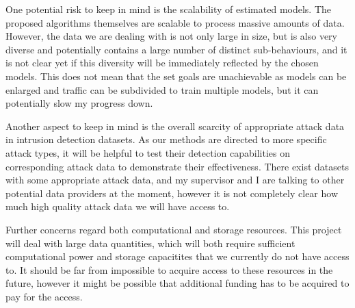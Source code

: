 \documentclass[a4paper,12pt,twoside]{report}
\begin{document}
One potential risk to keep in mind is the scalability of estimated models. The proposed algorithms themselves are scalable to process massive amounts of data. However, the data we are dealing with is not only large in size, but is also very diverse and potentially contains a large number of distinct sub-behaviours, and it is not clear yet if this diversity will be immediately reflected by the chosen models. This does not mean that the set goals are unachievable as models can be enlarged and traffic can be subdivided to train multiple models, but it can potentially slow my progress down.

Another aspect to keep in mind is the overall scarcity of appropriate attack data in intrusion detection datasets. As our methods are directed to more specific attack types, it will be helpful to test their detection capabilities on corresponding attack data to demonstrate their effectiveness. There exist datasets with some appropriate attack data, and my supervisor and I are talking to other potential data providers at the moment, however it is not completely clear how much high quality attack data we will have access to. 

Further concerns regard both computational and storage resources. This project will deal with large data quantities, which will both require sufficient computational power and storage capacitites that we currently do not have access to. It should be far from impossible to acquire access to these resources in the future, however it might be possible that additional funding has to be acquired to pay for the access. 







\end{document}
